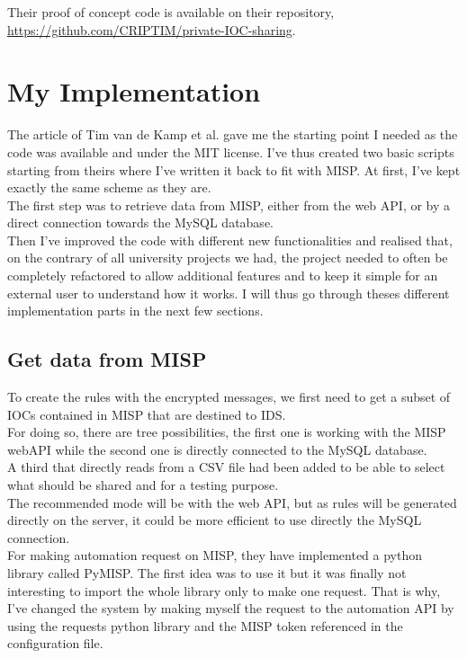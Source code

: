 \documentclass{eplmastersthesis}
\begin{document}
Their proof of concept code is available on their repository, \url{https://github.com/CRIPTIM/private-IOC-sharing}. 


\section{My Implementation}
The article of Tim van de Kamp et al. gave me the starting point I needed as the code was available and under the MIT license. I've thus created two basic scripts starting from theirs where I've written it back to fit with MISP. At first, I've kept exactly the same scheme as they are.\\
The first step was to retrieve data from MISP, either from the web API, or by a direct connection towards the MySQL database.\\
Then I've improved the code with different new functionalities and realised that, on the contrary of all university projects we had, the project needed to often be completely refactored to allow additional features and to keep it simple for an external user to understand how it works. I will thus go through theses different implementation parts in the next few sections.\\

\subsection{Get data from MISP}
To create the rules with the encrypted messages, we first need to get a subset of IOCs contained in MISP that are destined to IDS. \\
For doing so, there are tree possibilities, the first one is working with the MISP webAPI while the second one is directly connected to the MySQL database. \\
A third that directly reads from a CSV file had been added to be able to select what should be shared and for a testing purpose.\\
The recommended mode will be with the web API, but as rules will be generated directly on the server, it could be more efficient to use directly the MySQL connection.\\

For making automation request on MISP, they have implemented a python library called PyMISP. The first idea was to use it but it was finally not interesting to import the whole library only to make one request. That is why, I've changed the system by making myself the request to the automation API by using the requests python library and the MISP token referenced in the configuration file.\\
\end{document}
